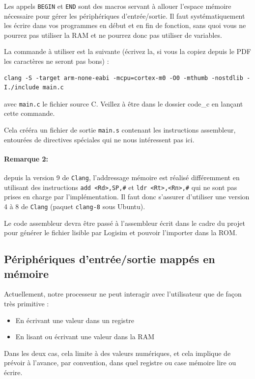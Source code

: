 \documentclass{article}
\begin{document}
    Les appels \texttt{BEGIN} et \texttt{END} sont des macros servant à allouer l'espace mémoire nécessaire pour gérer les périphériques d'entrée/sortie. Il faut systématiquement les écrire dans vos programmes en début et en fin de fonction, sans quoi vous ne pourrez pas utiliser la RAM et ne pourrez donc pas utiliser de variables.

    La commande à utiliser est la suivante (écrivez la, si vous la copiez depuis le PDF les caractères ne seront pas bons) :
    \begin{lstlisting}
clang -S -target arm-none-eabi -mcpu=cortex-m0 -O0 -mthumb -nostdlib -I./include main.c
    \end{lstlisting}
    avec \texttt{main.c} le fichier source C. Veillez à être dans le dossier code\_c en lançant cette commande.

    Cela crééra un fichier de sortie \texttt{main.s} contenant les instructions assembleur, entourées de directives spéciales qui ne nous intéressent pas ici.

    \paragraph{Remarque 2:} depuis la version 9 de \texttt{Clang}, l'addressage mémoire est réalisé différemment en utilisant des instructions \texttt{add <Rd>,SP,\#<imm8>} et \texttt{ldr <Rt>,<Rn>,\#<imm5>} qui ne sont pas prises en charge par l'implémentation.
    Il faut donc s'assurer d'utiliser une version 4 à 8 de \texttt{Clang} (paquet \texttt{clang-8} sous Ubuntu).

    Le code assembleur devra être passé à l'assembleur écrit dans le cadre du projet pour générer le fichier lisible par Logisim et pouvoir l'importer dans la ROM.
    
    \subsection{Périphériques d'entrée/sortie mappés en mémoire}
    
    Actuellement, notre processeur ne peut interagir avec l'utilisateur que de façon très primitive :
    \begin{itemize}
	    \item En écrivant une valeur dans un registre
	    \item En lisant ou écrivant une valeur dans la RAM
    \end{itemize}
    
    Dans les deux cas, cela limite à des valeurs numériques, et cela implique de prévoir à l'avance, par convention, dans quel registre ou case mémoire lire ou écrire.
    
\end{document}
